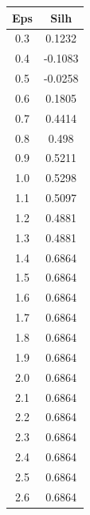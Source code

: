 \documentclass{classrep}
\begin{document}
{{{                \begin{table}[!htbp]
                    \begin{minipage}{.24\textwidth}
                        \centering
                        \begin{tabular}{|c|c|}
                            \hline
                            Eps & Silh \\ \hline
                            0.3 & 0.1232 \\ \hline
                            0.4 & -0.1083 \\ \hline
                            0.5 & -0.0258 \\ \hline
                            0.6 & 0.1805 \\ \hline
                            0.7 & 0.4414 \\ \hline
                            0.8 & 0.498 \\ \hline
                            0.9 & 0.5211 \\ \hline
                            1.0 & 0.5298 \\ \hline
                            1.1 & 0.5097 \\ \hline
                            1.2 & 0.4881 \\ \hline
                            1.3 & 0.4881 \\ \hline
                            1.4 & 0.6864 \\ \hline
                            1.5 & 0.6864 \\ \hline
                            1.6 & 0.6864 \\ \hline
                            1.7 & 0.6864 \\ \hline
                            1.8 & 0.6864 \\ \hline
                            1.9 & 0.6864 \\ \hline
                            2.0 & 0.6864 \\ \hline
                            2.1 & 0.6864 \\ \hline
                            2.2 & 0.6864 \\ \hline
                            2.3 & 0.6864 \\ \hline
                            2.4 & 0.6864 \\ \hline
                            2.5 & 0.6864 \\ \hline
                            2.6 & 0.6864 \\ \hline

\end{tabular}
\end{minipage}
\end{table}}}}
\end{document}
